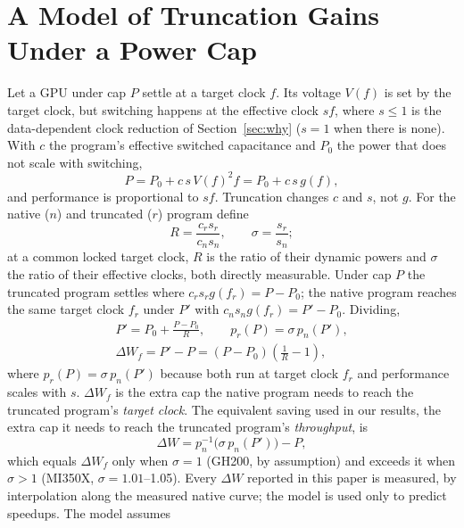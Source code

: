 \documentclass[conference]{IEEEtran}
\begin{document}
\section{A Model of Truncation Gains Under a Power Cap}\label{sec:model}

Let a GPU under cap $P$ settle at a target clock $f$. Its voltage $V(f)$ is set by the target clock, but switching
happens at the effective clock $sf$, where $s\le1$ is the data-dependent clock reduction of Section~\ref{sec:why}
($s=1$ when there is none). With $c$ the program's effective switched capacitance and $P_0$ the power that does not scale
with switching,
\begin{equation}
P = P_0 + c\,s\,V(f)^2 f = P_0 + c\,s\,g(f),
\end{equation}
and performance is proportional to $sf$. Truncation changes $c$ and $s$, not $g$. For the native ($n$) and truncated ($r$)
program define
\begin{equation}
R=\frac{c_rs_r}{c_ns_n},\qquad \sigma=\frac{s_r}{s_n};
\end{equation}
at a common locked target clock, $R$ is the ratio of their dynamic powers and $\sigma$ the ratio of their effective
clocks, both directly measurable. Under cap $P$ the truncated program settles where $c_rs_rg(f_r)=P-P_0$; the native
program reaches the same target clock $f_r$ under $P'$ with $c_ns_ng(f_r)=P'-P_0$. Dividing,
\begin{gather}
P'=P_0+\frac{P-P_0}{R},\qquad p_r(P)=\sigma\,p_n(P'),\label{eq:pred}\\
\Delta W_f=P'-P=(P-P_0)\left(\tfrac{1}{R}-1\right),\label{eq:dwf}
\end{gather}
where $p_r(P)=\sigma\,p_n(P')$ because both run at target clock $f_r$ and performance scales with $s$. $\Delta W_f$ is
the extra cap the native program needs to reach the truncated program's \emph{target clock}. The equivalent saving used
in our results, the extra cap it needs to reach the truncated program's \emph{throughput}, is
\begin{equation}
\Delta W=p_n^{-1}\!\bigl(\sigma\,p_n(P')\bigr)-P,
\end{equation}
which equals $\Delta W_f$ only when $\sigma=1$ (GH200, by assumption) and exceeds it when $\sigma>1$ (MI350X,
$\sigma=1.01$--1.05). Every $\Delta W$ reported in this paper is measured, by interpolation along the measured native
curve; the model is used only to predict speedups. The model assumes
\end{document}
